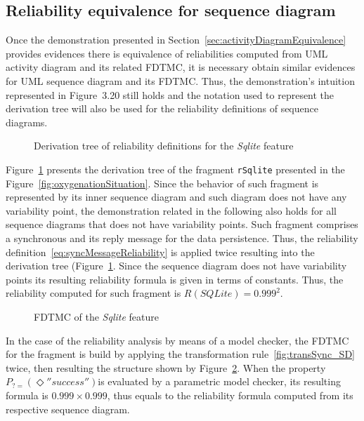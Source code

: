 \subsection{Reliability equivalence for sequence diagram
	\label{sec:sequenceDiagramEquivalence}}
%


Once the demonstration presented in
Section~\ref{sec:activityDiagramEquivalence} provides evidences there is
equivalence of reliabilities computed from UML activity diagram and its related
FDTMC, it is necessary obtain similar evidences for UML sequence diagram and
its FDTMC. Thus, the demonstration's intuition represented in
Figure~3.20 still holds  and the notation used to
represent the derivation tree will also be used for the reliability definitions
of sequence diagrams. 

\begin{figure}[htp]
	\centering
	
	\caption{Derivation tree of reliability definitions for the \emph{Sqlite} feature}
	\label{fig:derivationTreeSqliteMemory}
\end{figure}

Figure~\ref{fig:derivationTreeSqliteMemory} presents the derivation tree of the
fragment \texttt{rSqlite} presented in the
Figure~\ref{fig:oxygenationSituation}. Since the behavior of such fragment is
represented by its inner sequence diagram and such diagram does not have any
variability point, the demonstration related in the following also holds for all
sequence diagrams that does not have variability points. Such fragment
comprises a synchronous and its reply message for the data persistence. Thus,
the reliability definition~\ref{eq:syncMessageReliability} is applied twice
resulting into the derivation tree
(Figure~\ref{fig:derivationTreeSqliteMemory}. Since the sequence diagram does
not have variability points its resulting reliability formula is given in terms
of constants. Thus, the reliability computed for such fragment is $R(SQLite) =
0.999^2$.

\begin{figure}[htp]
	\centering
	
	\caption{FDTMC of the \emph{Sqlite} feature}
	\label{fig:fdtmcEquivalenceSqliteMemory}
\end{figure}

In the case of the reliability analysis by means of a model checker,
the FDTMC for the fragment is build by applying the transformation
rule~\ref{fig:transSync_SD} twice, then resulting the structure shown by
Figure~\ref{fig:fdtmcEquivalenceSqliteMemory}. When the property
$P_{?=}(\Diamond ''success'')$is evaluated by a parametric model checker, its
resulting formula is $0.999 \times 0.999$, thus equals to the reliability
formula computed from its respective sequence diagram. 


